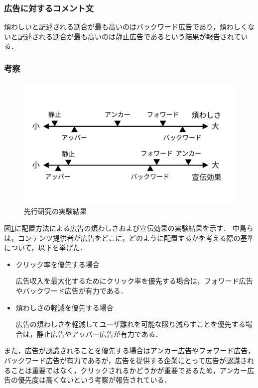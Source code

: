 \documentclass[12pt,a4j,titlepage]{ltjsarticle}
\begin{document}
\subsubsection{広告に対するコメント文}
煩わしいと記述される割合が最も高いのはバックワード広告であり，煩わしくないと記述される割合が最も高いのは静止広告であるという結果が報告されている．

\subsubsection{考察}
\begin{figure}[H]
\begin{center}
 \includegraphics[height=65mm]{figures/先行研究結果.pdf}
\end{center}
 \caption{先行研究の実験結果}
 \label{fig:先行研究結果}
\end{figure}

図\ref{fig:先行研究結果}に配置方法による広告の煩わしさおよび宣伝効果の実験結果を示す．
中島らは，コンテンツ提供者が広告をどこに，どのように配置するかを考える際の基準について，以下を挙げた．

\begin{itemize}
\item クリック率を優先する場合

広告収入を最大化するためにクリック率を優先する場合は，フォワード広告やバックワード広告が有力である．

\item 煩わしさの軽減を優先する場合

広告の煩わしさを軽減してユーザ離れを可能な限り減らすことを優先する場合は，静止広告やアッパー広告が有力である．
\end{itemize}

また，広告が認識されることを優先する場合はアンカー広告やフォワード広告，バックワード広告が有力であるが，広告を提供する企業にとって広告が認識されることは重要ではなく，クリックされるかどうかが重要であるため，アンカー広告の優先度は高くないという考察が報告されている．
\end{document}
